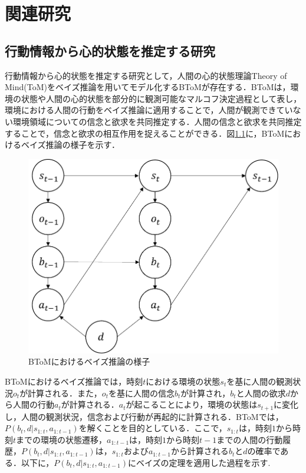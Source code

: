 \chapter{関連研究}
\section{行動情報から心的状態を推定する研究}
\par
行動情報から心的状態を推定する研究として，人間の心的状態理論Theory of Mind(ToM)をベイズ推論を用いてモデル化するBToM\cite{baker2011bayesian}が存在する．BToMは，環境の状態や人間の心的状態を部分的に観測可能なマルコフ決定過程として表し，環境における人間の行動をベイズ推論に適用することで，人間が観測できていない環境領域についての信念と欲求を共同推定する．人間の信念と欲求を共同推定することで，信念と欲求の相互作用を捉えることができる．図\ref{fig:btom}に，BToMにおけるベイズ推論の様子を示す．
\begin{figure}[htbp]
  \begin{center}
    \includegraphics[scale=0.85]{./btom.pdf}
    \caption{BToMにおけるベイズ推論の様子}
    \label{fig:btom}
  \end{center}
\end{figure}
BToMにおけるベイズ推論では，時刻$t$における環境の状態$s_{t}$を基に人間の観測状況$o_{t}$が計算される．また，$o_{t}$を基に人間の信念$b_{t}$が計算され，$b_{t}$と人間の欲求$d$から人間の行動$a_{t}$が計算される．$a_{t}$が起こることにより，環境の状態は$s_{t+1}$に変化し，人間の観測状況，信念および行動が再起的に計算される．BToMでは，$P(b_t,d|s_{1:t},a_{1:t-1})$を解くことを目的としている．ここで，$s_{1:t}$は，時刻$1$から時刻$t$までの環境の状態遷移，$a_{1:t-1}$は，時刻$1$から時刻$t-1$までの人間の行動履歴，$P(b_t,d|s_{1:t},a_{1:t-1})$は，$s_{1:t}$および$a_{1:t-1}$から計算される$b_t$と$d$の確率である．以下に，$P(b_t,d|s_{1:t},a_{1:t-1})$にベイズの定理\cite{ベイズ}を適用した過程を示す.
